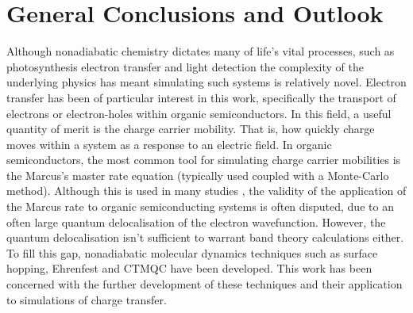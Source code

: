 \chapter{General Conclusions and Outlook}
\label{chap:outlook}
Although nonadiabatic chemistry dictates many of life's vital processes, such as\remove{:} photosynthesis\replace{;}{,} electron transfer\replace{;}{,} and light detection \cite{Dral2018}\replace{;}{,} the complexity of the underlying physics has meant simulating such systems is relatively novel. Electron transfer has been of particular interest in this work, specifically the transport of electrons or electron-holes within organic semiconductors. In this field, a useful quantity of merit is the charge carrier mobility. That is, how quickly charge moves within a system as a response to an electric field. In organic semiconductors, the most common tool for simulating charge carrier mobilities is the Marcus's master rate equation (typically used coupled with a Monte-Carlo method). Although this is used in many studies \cite{Marcus1, Marcus2, Marcus3, Marcus4, Marcus5, Marcus6, Marcus7, Marcus8}, the validity of the application of the Marcus rate to organic semiconducting systems is often disputed, due to an often large quantum delocalisation of the electron wavefunction. However, the quantum delocalisation isn't sufficient to warrant band theory calculations either. To fill this gap, nonadiabatic molecular dynamics techniques such as surface hopping, Ehrenfest and CTMQC have been developed. This work has been concerned with the further development of these techniques and their application to simulations of charge transfer.
\\\\
